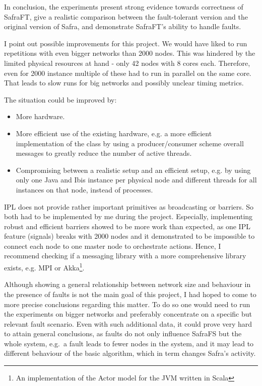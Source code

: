 In conclusion, the experiments present strong evidence towards correctness of SafraFT, give a realistic comparison between the fault-tolerant version and the original version of Safra, and demonstrate SafraFT's ability to handle faults.

I point out possible improvements for this project. We would have liked to run repetitions with even bigger networks than 2000 nodes.
This was hindered by the limited physical resources at hand - only 42 nodes with 8 cores each.
Therefore, even for 2000 instance multiple of these had to run in parallel on the same core.
That leads to slow runs for big networks and possibly unclear timing metrics.

The situation could be improved by:
\begin{itemize}
    \item More hardware.
    \item More efficient use of the existing hardware, e.g. a more efficient implementation of the  class by using a producer/consumer scheme overall messages to greatly reduce the number of active threads.
    \item Compromising between a realistic setup and an efficient setup, e.g. by using only one Java and Ibis instance per physical node and different threads for all instances on that node, instead of processes.
\end{itemize}

IPL does not provide rather important primitives as broadcasting or barriers.
So both had to be implemented by me during the project.
Especially, implementing robust and efficient barriers showed to be more work than expected, as one IPL feature (signals) breaks with 2000 nodes and it demonstrated to be impossible to connect each node to one master node to orchestrate actions.
Hence, I recommend checking if a messaging library with a more comprehensive library exists, e.g. MPI or Akka\footnote{An implementation of the Actor model for the JVM written in Scala}.

Although showing a general relationship between network size and behaviour in the presence of faults is not the main goal of this project, I had hoped to come to more precise conclusions regarding this matter.
To do so one would need to run the experiments on bigger networks and preferably concentrate on a specific but relevant fault scenario.
Even with such additional data, it could prove very hard to attain general conclusions, as faults do not only influence SafraFS but the whole system, e.g.\ a fault leads to fewer nodes in the system, and it may lead to different behaviour of the basic algorithm, which in term changes Safra's activity.

